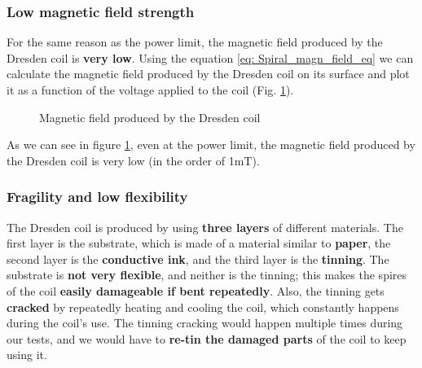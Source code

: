 \subsubsection{Low magnetic field strength}
For the same reason as the power limit, the magnetic field produced by the Dresden coil is \textbf{very low}.
Using the equation \ref{eq: Spiral_magn_field_eq} we can calculate the magnetic field produced by the Dresden coil on its surface and plot it as a function of the voltage applied to the coil (Fig. \ref{fig: Dresden_magnetic_field}).
\begin{figure}[H]
    \centering
    \resizebox{0.5\textwidth}{!}{
        
    }
    \caption{Magnetic field produced by the Dresden coil}
    \label{fig: Dresden_magnetic_field}
\end{figure}

As we can see in figure \ref{fig: Dresden_magnetic_field}, even at the power limit, the magnetic field produced by the Dresden coil is very low (in the order of 1mT).

\subsubsection{Fragility and low flexibility}
The Dresden coil is produced by using \textbf{three layers} of different materials.
The first layer is the substrate, which is made of a material similar to \textbf{paper}, the second layer is the \textbf{conductive ink}, and the third layer is the \textbf{tinning}.
The substrate is \textbf{not very flexible}, and neither is the tinning;
this makes the spires of the coil \textbf{easily damageable if bent repeatedly}.
Also, the tinning gets \textbf{cracked} by repeatedly heating and cooling the coil, which constantly happens during the coil's use.
The tinning cracking would happen multiple times during our tests, and we would have to \textbf{re-tin the damaged parts} of the coil to keep using it.